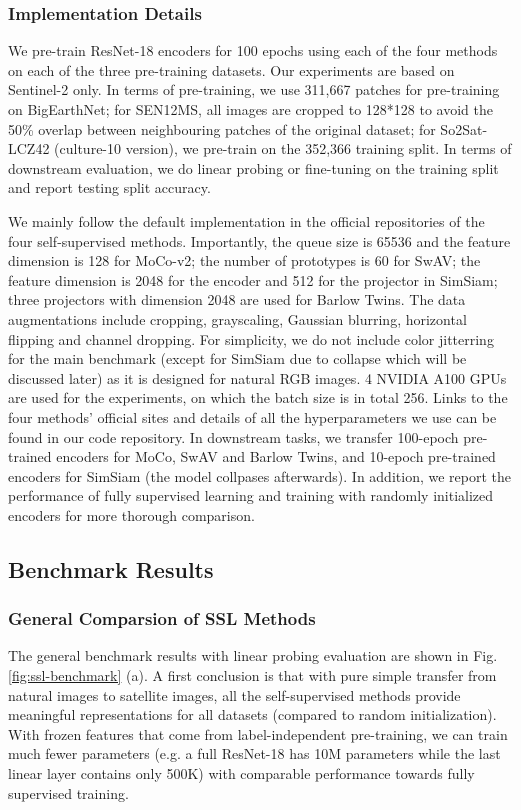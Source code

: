 \documentclass[lettersize,journal]{IEEEtran}
\begin{document}
\subsubsection{Implementation Details} We pre-train ResNet-18 encoders for 100 epochs using each of the four methods on each of the three pre-training datasets. Our experiments are based on Sentinel-2 only. In terms of pre-training, we use 311,667 patches for pre-training on BigEarthNet; for SEN12MS, all images are cropped to 128*128 to avoid the 50\% overlap between neighbouring patches of the original dataset; for So2Sat-LCZ42 (culture-10 version), we pre-train on the 352,366 training split. In terms of downstream evaluation, we do linear probing or fine-tuning on the training split and report testing split accuracy. 

We mainly follow the default implementation in the official repositories of the four self-supervised methods. Importantly, the queue size is 65536 and the feature dimension is 128 for MoCo-v2; the number of prototypes is 60 for SwAV; the feature dimension is 2048 for the encoder and 512 for the projector in SimSiam; three projectors with dimension 2048 are used for Barlow Twins. The data augmentations include cropping, grayscaling, Gaussian blurring, horizontal flipping and channel dropping. For simplicity, we do not include color jitterring for the main benchmark (except for SimSiam due to collapse which will be discussed later) as it is designed for natural RGB images. 4 NVIDIA A100 GPUs are used for the experiments, on which the batch size is in total 256. Links to the four methods' official sites and details of all the hyperparameters we use can be found in our code repository. In downstream tasks, we transfer 100-epoch pre-trained encoders for MoCo, SwAV and Barlow Twins, and 10-epoch pre-trained encoders for SimSiam (the model collpases afterwards). In addition, we report the performance of fully supervised learning and training with randomly initialized encoders for more thorough comparison. 
\color{black}


\subsection{Benchmark Results}

\subsubsection{General Comparsion of SSL Methods}

The general benchmark results with linear probing evaluation are shown in Fig. \ref{fig:ssl-benchmark} (a). A first conclusion is that with pure simple transfer from natural images to satellite images, all the self-supervised methods provide meaningful representations for all datasets (compared to random initialization). With frozen features that come from label-independent pre-training, we can train much fewer parameters (e.g. a full ResNet-18 has 10M parameters while the last linear layer contains only 500K) with comparable performance towards fully supervised training. 
\end{document}
